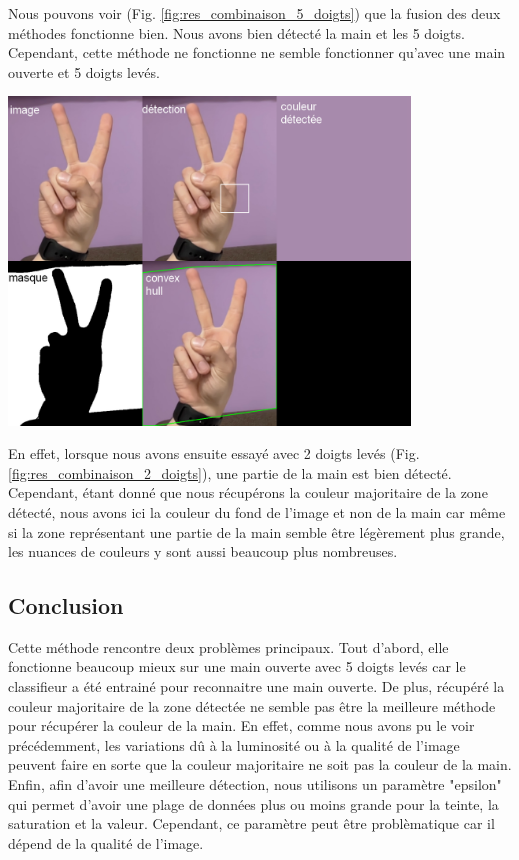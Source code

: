 \documentclass[11pt]{article}
\begin{document}
\bigbreak

Nous pouvons voir (Fig. \ref{fig:res_combinaison_5_doigts}) que la fusion des deux méthodes fonctionne bien. Nous avons bien détecté la main et les 5 doigts.
Cependant, cette méthode ne fonctionne ne semble fonctionner qu'avec une main ouverte et 5 doigts levés. \bigbreak

\begin{center}
    \includegraphics[width=0.8\textwidth]{images/res_combinaison_2_doigts.png}
    \label{fig:res_combinaison_2_doigts}
\end{center}

En effet, lorsque nous avons ensuite essayé avec 2 doigts levés (Fig. \ref{fig:res_combinaison_2_doigts}), une partie de la main est bien détecté. Cependant, étant donné que nous récupérons la couleur majoritaire de la zone détecté, nous avons ici la couleur du fond de l'image et non de la main car même si la zone représentant une partie de la main semble être légèrement plus grande, les nuances de couleurs y sont aussi beaucoup plus nombreuses. 

\subsection{Conclusion}
Cette méthode rencontre deux problèmes principaux. Tout d'abord, elle fonctionne beaucoup mieux sur une main ouverte avec 5 doigts levés car le classifieur a été entrainé pour reconnaitre une main ouverte. 
De plus, récupéré la couleur majoritaire de la zone détectée ne semble pas être la meilleure méthode pour récupérer la couleur de la main. En effet, comme nous avons pu le voir précédemment, les variations dû à la luminosité ou à la qualité de l'image peuvent faire en sorte que la couleur majoritaire ne soit pas la couleur de la main. Enfin, afin d'avoir une meilleure détection, nous utilisons un paramètre "epsilon" qui permet d'avoir une plage de données plus ou moins grande pour la teinte, la saturation et la valeur. Cependant, ce paramètre peut être problèmatique car il dépend de la qualité de l'image. \bigbreak
\end{document}
